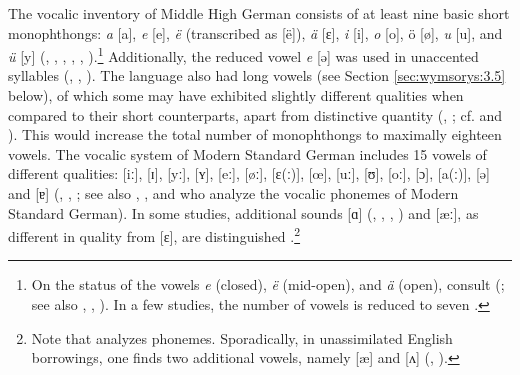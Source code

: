 \documentclass[output=paper,hidelinks]{langscibook}
\begin{document}
The vocalic inventory of Middle High German consists of at least nine basic short monophthongs: \textit{a} [a], \textit{e} [e], \textit{ë} (transcribed as [ë]), \textit{ä} [ɛ], \textit{i} [i], \textit{o} [o], ö [ø], \textit{u} [u], and \textit{ü} [y] (\citealt[2--5]{wright_middle_1917}, \citealt[1131, 1133]{simmler_phonetik_1985}, \citealt[36--37, 41]{de_boor_mittelhochdeutsche_1973}, \citealt[62--63, 87--97]{paul_mittelhochdeutsche_2007}, \citealt[9]{hall_underlying_2017}, \citealt[69]{schmidt_einfuhrung_2017}).\footnote{On the status of the vowels \textit{e} (closed), \textit{ë} (mid-open), and \textit{ä} (open), consult \citeauthor{simmler_phonetik_1985} (\citeyear[1132, 1134]{simmler_phonetik_1985}; see also \citealt[2--5]{wright_middle_1917}, \citealt[36--37, 41]{de_boor_mittelhochdeutsche_1973}, \citealt[87--91]{paul_mittelhochdeutsche_2007}). In a few studies, the number of vowels is reduced to seven \citep[184--185]{caratini_vocalic_2009}.} Additionally, the reduced vowel \textit{e} [ə] was used in unaccented syllables (\citealt[3]{wright_middle_1917}, \citealt[1133]{simmler_phonetik_1985}, \citealt[9]{hall_underlying_2017}). The language also had long vowels (see Section \ref{sec:wymsorys:3.5} below), of which some may have exhibited slightly different qualities when compared to their short counterparts, apart from distinctive quantity (\citealt[3]{wright_middle_1917}, \citealt[185]{caratini_vocalic_2009}; cf. \citealt[9]{hall_underlying_2017} and \citealt[69]{schmidt_einfuhrung_2017}). This would increase the total number of monophthongs to maximally eighteen vowels. The vocalic system of Modern Standard German includes 15 vowels of different qualities: [iː], [ɪ], [yː], [ʏ], [eː], [øː], [ɛ(ː)], [œ], [uː], [ʊ], [oː], [ɔ], [a(ː)], [ə] and [ɐ] 
(\citealt[7, 17]{fagan_german_2009}, \citealt[109--110]{johnson_exploring_2008}, \citealt[17--19]{obrein_german_2016}; see also \citealt[119]{russ_german_1994}, \citealt[19--21]{wiese_phonology_1996}, and \citealt[35, 41]{fox_structure_2005} who analyze the vocalic phonemes of Modern Standard German). In some studies, additional sounds [ɑ] (\citealt[350]{eisenberg_german_1994}, \citealt[3]{dodd_modern_2003}, \citealt[110]{johnson_exploring_2008}, \citealt[71]{caratini_vocalic_2009}) and [æː], as different in quality from [ɛ], are distinguished \citep[35--36, 38]{fox_structure_2005}.\footnote{Note that \citet{fox_structure_2005} analyzes phonemes. Sporadically, in unassimilated English borrowings, one finds two additional vowels, namely [æ] and [ʌ] (\citealt[53]{fox_structure_2005}, \citealt[73]{caratini_vocalic_2009}).} 
\end{document}
